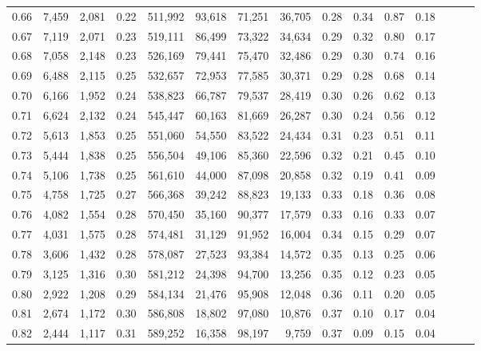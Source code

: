 \begin{tabular}{rrrrrrrrrrrrrrr}
0.66 &   7,459 &  2,081 &  0.22 &  511,992 &   93,618 &   71,251 &   36,705 &  0.28 &  0.34 &  0.87 &      0.18 \\
0.67 &   7,119 &  2,071 &  0.23 &  519,111 &   86,499 &   73,322 &   34,634 &  0.29 &  0.32 &  0.80 &      0.17 \\
0.68 &   7,058 &  2,148 &  0.23 &  526,169 &   79,441 &   75,470 &   32,486 &  0.29 &  0.30 &  0.74 &      0.16 \\
0.69 &   6,488 &  2,115 &  0.25 &  532,657 &   72,953 &   77,585 &   30,371 &  0.29 &  0.28 &  0.68 &      0.14 \\
0.70 &   6,166 &  1,952 &  0.24 &  538,823 &   66,787 &   79,537 &   28,419 &  0.30 &  0.26 &  0.62 &      0.13 \\
0.71 &   6,624 &  2,132 &  0.24 &  545,447 &   60,163 &   81,669 &   26,287 &  0.30 &  0.24 &  0.56 &      0.12 \\
0.72 &   5,613 &  1,853 &  0.25 &  551,060 &   54,550 &   83,522 &   24,434 &  0.31 &  0.23 &  0.51 &      0.11 \\
0.73 &   5,444 &  1,838 &  0.25 &  556,504 &   49,106 &   85,360 &   22,596 &  0.32 &  0.21 &  0.45 &      0.10 \\
0.74 &   5,106 &  1,738 &  0.25 &  561,610 &   44,000 &   87,098 &   20,858 &  0.32 &  0.19 &  0.41 &      0.09 \\
0.75 &   4,758 &  1,725 &  0.27 &  566,368 &   39,242 &   88,823 &   19,133 &  0.33 &  0.18 &  0.36 &      0.08 \\
0.76 &   4,082 &  1,554 &  0.28 &  570,450 &   35,160 &   90,377 &   17,579 &  0.33 &  0.16 &  0.33 &      0.07 \\
0.77 &   4,031 &  1,575 &  0.28 &  574,481 &   31,129 &   91,952 &   16,004 &  0.34 &  0.15 &  0.29 &      0.07 \\
0.78 &   3,606 &  1,432 &  0.28 &  578,087 &   27,523 &   93,384 &   14,572 &  0.35 &  0.13 &  0.25 &      0.06 \\
0.79 &   3,125 &  1,316 &  0.30 &  581,212 &   24,398 &   94,700 &   13,256 &  0.35 &  0.12 &  0.23 &      0.05 \\
0.80 &   2,922 &  1,208 &  0.29 &  584,134 &   21,476 &   95,908 &   12,048 &  0.36 &  0.11 &  0.20 &      0.05 \\
0.81 &   2,674 &  1,172 &  0.30 &  586,808 &   18,802 &   97,080 &   10,876 &  0.37 &  0.10 &  0.17 &      0.04 \\
0.82 &   2,444 &  1,117 &  0.31 &  589,252 &   16,358 &   98,197 &    9,759 &  0.37 &  0.09 &  0.15 &      0.04 \\

\end{tabular}
